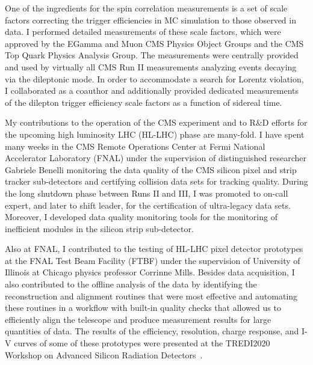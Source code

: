 \begin{refsection}
One of the ingredients for the \ttbar spin correlation measurements is a set of scale factors correcting the trigger efficiencies in MC simulation to those observed in data.
I performed detailed measurements of these scale factors, which were approved by the EGamma and Muon CMS Physics Object Groups and the CMS Top Quark Physics Analysis Group.
The measurements were centrally provided and used by virtually all CMS Run II measurements analyzing \ttbar events decaying via the dileptonic mode.
In order to accommodate a search for Lorentz violation, I collaborated as a coauthor and additionally provided dedicated measurements of the dilepton trigger efficiency scale factors as a function of sidereal time.

My contributions to the operation of the CMS experiment and to R\&D efforts for the upcoming high luminosity LHC (HL-LHC) phase are many-fold.
I have spent many weeks in the CMS Remote Operations Center at Fermi National Accelerator Laboratory (FNAL) under the supervision of distinguished researcher Gabriele Benelli monitoring the data quality of the CMS silicon pixel and strip tracker sub-detectors and certifying collision data sets for tracking quality.
During the long shutdown phase between Runs II and III, I was promoted to on-call expert, and later to shift leader, for the certification of ultra-legacy data sets.
Moreover, I developed data quality monitoring tools for the monitoring of inefficient modules in the silicon strip sub-detector.

Also at FNAL, I contributed to the testing of HL-LHC pixel detector prototypes at the FNAL Test Beam Facility (FTBF) under the supervision of University of Illinois at Chicago physics professor Corrinne Mills.
Besides data acquisition, I also contributed to the offline analysis of the data by identifying the reconstruction and alignment routines that were most effective and automating these routines in a workflow with built-in quality checks that allowed us to efficiently align the telescope and produce measurement results for large quantities of data.
The results of the efficiency, resolution, charge response, and I-V curves of some of these prototypes were presented at the TREDI2020 Workshop on Advanced Silicon Radiation Detectors~\cite{TREDI2020}.


\end{refsection}
